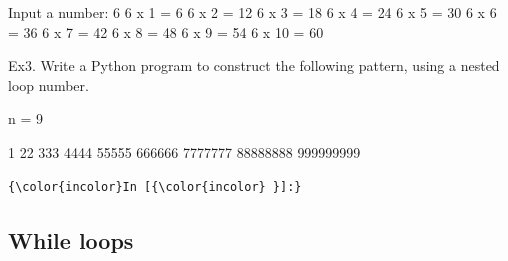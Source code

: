 \documentclass[11pt]{article}
\newenvironment{Shaded}{}{}
\newcommand{\DecValTok}[1]{\textcolor[rgb]{0.25,0.63,0.44}{{#1}}}
\newcommand{\NormalTok}[1]{{#1}}
\newcommand{\OperatorTok}[1]{\textcolor[rgb]{0.40,0.40,0.40}{{#1}}}
\begin{document}
\begin{Shaded}
\begin{Highlighting}[]
\NormalTok{Input a number: }\DecValTok{6}                                                       
\DecValTok{6}\NormalTok{ x }\DecValTok{1} \OperatorTok{=} \DecValTok{6}                                                               
\DecValTok{6}\NormalTok{ x }\DecValTok{2} \OperatorTok{=} \DecValTok{12}                                                              
\DecValTok{6}\NormalTok{ x }\DecValTok{3} \OperatorTok{=} \DecValTok{18}                                                              
\DecValTok{6}\NormalTok{ x }\DecValTok{4} \OperatorTok{=} \DecValTok{24}                                                              
\DecValTok{6}\NormalTok{ x }\DecValTok{5} \OperatorTok{=} \DecValTok{30}                                                              
\DecValTok{6}\NormalTok{ x }\DecValTok{6} \OperatorTok{=} \DecValTok{36}                                                              
\DecValTok{6}\NormalTok{ x }\DecValTok{7} \OperatorTok{=} \DecValTok{42}                                                              
\DecValTok{6}\NormalTok{ x }\DecValTok{8} \OperatorTok{=} \DecValTok{48}                                                              
\DecValTok{6}\NormalTok{ x }\DecValTok{9} \OperatorTok{=} \DecValTok{54}                                                              
\DecValTok{6}\NormalTok{ x }\DecValTok{10} \OperatorTok{=} \DecValTok{60} 
\end{Highlighting}
\end{Shaded}

    Ex3. Write a Python program to construct the following pattern, using a
nested loop number.

\begin{Shaded}
\begin{Highlighting}[]
\NormalTok{n }\OperatorTok{=} \DecValTok{9}

\DecValTok{1}
\DecValTok{22}
\DecValTok{333}
\DecValTok{4444}
\DecValTok{55555}
\DecValTok{666666}
\DecValTok{7777777}
\DecValTok{88888888}
\DecValTok{999999999}
\end{Highlighting}
\end{Shaded}

    \begin{Verbatim}[commandchars=\\\{\}]
{\color{incolor}In [{\color{incolor} }]:} 
\end{Verbatim}


    \subsection{While loops}\label{while-loops}
\end{document}
